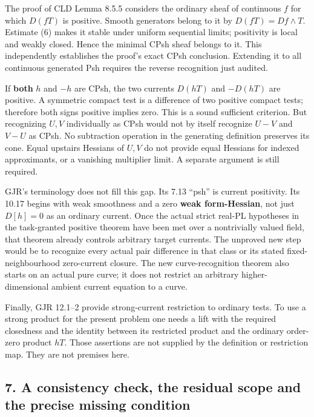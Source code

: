 \documentclass[
  11pt,
]{article}
\begin{document}
The proof of CLD Lemma 8.5.5 considers the ordinary sheaf of continuous
\(f\) for which \(D(fT)\) is positive. Smooth generators belong to it by
\(D(fT)=Df\wedge T\). Estimate (6) makes it stable under uniform
sequential limits; positivity is local and weakly closed. Hence the
minimal CPsh sheaf belongs to it. This independently establishes the
proof's exact CPsh conclusion. Extending it to all continuous generated
Psh requires the reverse recognition just audited.

If \textbf{both} \(h\) and \(-h\) are CPsh, the two currents \(D(hT)\)
and \(-D(hT)\) are positive. A symmetric compact test is a difference of
two positive compact tests; therefore both signs positive implies zero.
This is a sound sufficient criterion. But recognizing \(U,V\)
individually as CPsh would not by itself recognize \(U-V\) and \(V-U\)
as CPsh. No subtraction operation in the generating definition preserves
its cone. Equal upstairs Hessians of \(U,V\) do not provide equal
Hessians for indexed approximants, or a vanishing multiplier limit. A
separate argument is still required.

GJR's terminology does not fill this gap. Its 7.13 ``psh'' is current
positivity. Its 10.17 begins with weak smoothness and a zero
\textbf{weak form-Hessian}, not just \(D[h]=0\) as an ordinary current.
Once the actual strict real-PL hypotheses in the task-granted positive
theorem have been met over a nontrivially valued field, that theorem
already controls arbitrary target currents. The unproved new step would
be to recognize every actual pair difference in that class or its stated
fixed-neighbourhood zero-current closure. The new curve-recognition
theorem also starts on an actual pure curve; it does not restrict an
arbitrary higher-dimensional ambient current equation to a curve.

Finally, GJR 12.1--2 provide strong-current restriction to ordinary
tests. To use a strong product for the present problem one needs a lift
with the required closedness and the identity between its restricted
product and the ordinary order-zero product \(hT\). Those assertions are
not supplied by the definition or restriction map. They are not premises
here.

\subsection{7. A consistency check, the residual scope and the precise
missing
condition}\label{a-consistency-check-the-residual-scope-and-the-precise-missing-condition}
\end{document}
